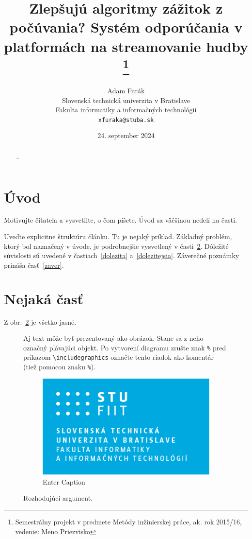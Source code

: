 \documentclass[8pt,,slovak,a4paper]{article}
\title{Zlepšujú algoritmy zážitok z počúvania? Systém odporúčania v platformách na streamovanie hudby \thanks{Semestrálny projekt v predmete Metódy inžinierskej práce, ak. rok 2015/16, vedenie: Meno Priezvisko}} %
\author{Adam Furák\\[2pt]
	{\small Slovenská technická univerzita v Bratislave}\\
	{\small Fakulta informatiky a informačných technológií}\\
	{\small \texttt{xfuraka@stuba.sk}}
	}
\date{\small 24. september 2024} %
\begin{document}
\maketitle

\begin{abstract}
\ldots
\end{abstract}



\section{Úvod}



Motivujte čitateľa a vysvetlite, o čom píšete. Úvod sa väčšinou nedelí na časti.


Uveďte explicitne štruktúru článku. Tu je nejaký príklad.
Základný problém, ktorý bol naznačený v úvode, je podrobnejšie vysvetlený v časti~\ref{nejaka}.
Dôležité súvislosti sú uvedené v častiach~\ref{dolezita} a~\ref{dolezitejsia}.
Záverečné poznámky prináša časť~\ref{zaver}.



\section{Nejaká časť} \label{nejaka}

Z obr.~\ref{f:rozhod} je všetko jasné. 

\begin{figure}[tbh]
\centering

\cite{madathil2017music}Aj text môže byť prezentovaný ako obrázok. Stane sa z neho označný plávajúci objekt. Po vytvorení diagramu zrušte znak \texttt{\%} pred príkazom \verb|\includegraphics| označte tento riadok ako komentár (tiež pomocou znaku \texttt{\%}).
\begin{figure}
    \centering
    \includegraphics[width=0.5\linewidth]{STU-FIIT-nfnv.png}
    \caption{Enter Caption}
    \label{fig:enter-label}
\end{figure}
\caption{Rozhodujúci argument.}
\label{f:rozhod}
\end{figure}
\end{document}
